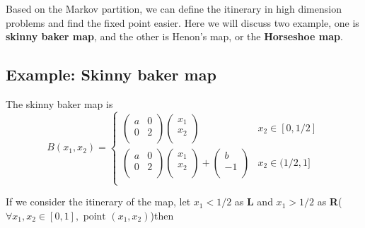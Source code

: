 \documentclass[12pt]{article}
\theoremstyle{plain}
\begin{document}
Based on the Markov partition, we can define the itinerary in high dimension problems and find the fixed point easier. Here we will discuss two example, one is \textbf{skinny baker map}, and the other is Henon's map, or the \textbf{Horseshoe map}.



\subsection{Example: Skinny baker map}
The skinny baker map is 
$$
B(x_1, x_2) = \left\{\begin{array}{ll}
    \left(\begin{array}{cc}
        a   & 0 \\
        0   & 2 \\
    \end{array}\right)
    \left(\begin{array}{c}
        x_1 \\
        x_2 \\
    \end{array}\right) 
& 
    x_2 \in [0, 1/2]\\
    \left(\begin{array}{cc}
        a   & 0 \\
        0   & 2 \\
    \end{array}\right)
    \left(\begin{array}{c}
        x_1 \\
        x_2 \\
    \end{array}\right) +
    \left(\begin{array}{c}
        b  \\
        -1 \\
    \end{array}\right) 
& 
    x_2 \in (1/2, 1]\\
\end{array}\right.
$$

If we consider the itinerary of the map, let $x_1 < 1/2$ as \textbf{L} and $x_1 > 1/2$ as \textbf{R}($\forall x_1, x_2 \in [0, 1], \text{ point }(x_1, x_2)$)then \\[2ex]
\end{document}
